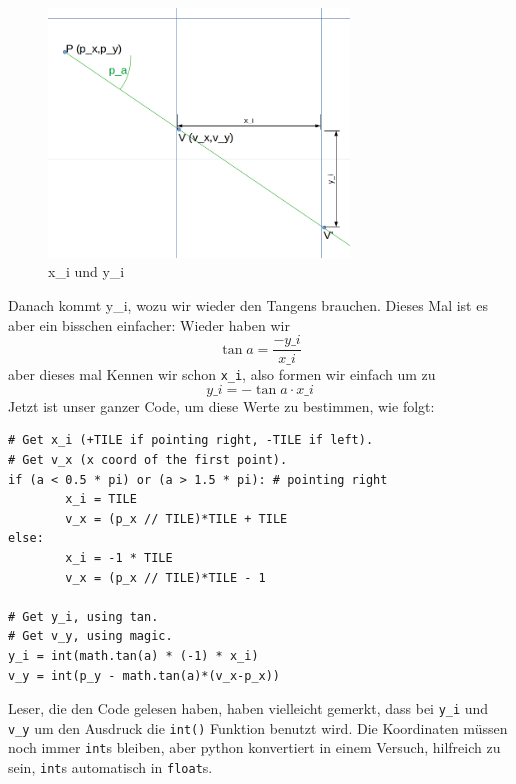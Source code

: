 \documentclass[a4paper,12pt]{report}
\begin{document}
\begin{figure}[htbp] 
        \centering
        \includegraphics[width=8cm]{vcheck2.png} 
        \caption{x\_i und y\_i}
\end{figure}
Danach kommt y\_i, wozu wir wieder den Tangens brauchen. Dieses Mal ist es aber ein bisschen einfacher: Wieder haben wir \[\tan a = \frac{-y\_i}{x\_i}\]aber dieses mal Kennen wir schon \texttt{x\_i}, also formen wir einfach um zu \[y\_i = -\tan a \cdot x\_i\]
Jetzt ist unser ganzer Code, um diese Werte zu bestimmen, wie folgt:
\begin{Verbatim}[baselinestretch=1.0, xleftmargin=1cm]
# Get x_i (+TILE if pointing right, -TILE if left).
# Get v_x (x coord of the first point).
if (a < 0.5 * pi) or (a > 1.5 * pi): # pointing right
        x_i = TILE
        v_x = (p_x // TILE)*TILE + TILE
else:
        x_i = -1 * TILE
        v_x = (p_x // TILE)*TILE - 1

# Get y_i, using tan.
# Get v_y, using magic.
y_i = int(math.tan(a) * (-1) * x_i)
v_y = int(p_y - math.tan(a)*(v_x-p_x))
\end{Verbatim}

Leser, die den Code gelesen haben, haben vielleicht gemerkt, dass bei \texttt{y\_i} und \texttt{v\_y} um den Ausdruck die \texttt{int()} Funktion benutzt wird. Die Koordinaten m\"ussen noch immer \texttt{int}s bleiben, aber python konvertiert in einem Versuch, hilfreich zu sein, \texttt{int}s automatisch in \texttt{float}s.
\end{document}
